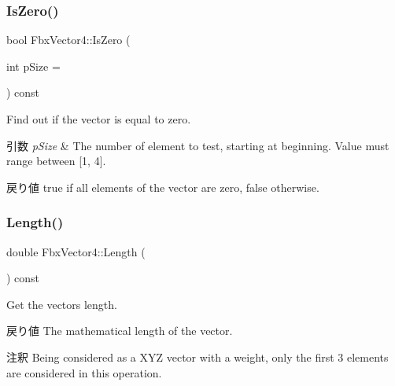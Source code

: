 \mbox{\label{class_fbx_vector4_ad64896518153da4f6c72b8d75082c8f3}} 
\subsubsection{\texorpdfstring{Is\+Zero()}{IsZero()}}
{\footnotesize\ttfamily bool Fbx\+Vector4\+::\+Is\+Zero (\begin{DoxyParamCaption}\item[{int}]{p\+Size = {} }\end{DoxyParamCaption}) const}

Find out if the vector is equal to zero. 
\begin{DoxyParams}{引数}
{\em p\+Size} & The number of element to test, starting at beginning. Value must range between \mbox{[}1, 4\mbox{]}. \\
\hline
\end{DoxyParams}
\begin{DoxyReturn}{戻り値}
{\ttfamily true} if all elements of the vector are zero, {\ttfamily false} otherwise. 
\end{DoxyReturn}
\mbox{\label{class_fbx_vector4_acf75b4a04b333460947133c59c57fd6b}} 
\subsubsection{\texorpdfstring{Length()}{Length()}}
{\footnotesize\ttfamily double Fbx\+Vector4\+::\+Length (\begin{DoxyParamCaption}{ }\end{DoxyParamCaption}) const}

Get the vector\textquotesingle{}s length. \begin{DoxyReturn}{戻り値}
The mathematical length of the vector. 
\end{DoxyReturn}
\begin{DoxyRemark}{注釈}
Being considered as a X\+YZ vector with a weight, only the first 3 elements are considered in this operation. 
\end{DoxyRemark}
\mbox{\label{class_fbx_vector4_a4eb04e00042eb1b067fabc4c581256ae}} 
